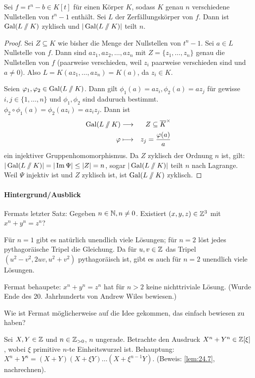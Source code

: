 \documentclass[12pt,a4paper]{scrartcl}
\begin{document}
\begin{lem}\label{lem:24.7}
	Sei $f = t^n-b\in K[t]$ für einen Körper $K$, sodass $K$ genau $n$ verschiedene Nullstellen von $t^n-1$ enthält. Sei $L$ der Zerfällungskörper von $f$. Dann ist $\operatorname{Gal}(L\sslash K)$ zyklisch und $|\operatorname{Gal}(L\sslash K)|$ teilt $n$.
\end{lem}
\begin{proof}
	Sei $Z\subseteq K$ wie bisher die Menge der Nullstellen von $t^n-1$. Sei $a\in L$ Nullstelle von $f$. Dann sind $az_1, az_2,\dots, az_n$ mit $Z  = \{z_1,\dots, z_n\}$ genau die Nullstellen von $f$ (paarweise verschieden, weil $z_i$ paarweise verschieden sind und $a\neq 0$). Also $L = K(az_1,\dots, az_n)  = K(a)$, da $z_i\in K$.
	
	Seien $\varphi_1,\varphi_2\in \operatorname{Gal}(L\sslash K)$. Dann gilt $\phi_1(a) = az_i, \phi_2(a) = az_j$ für gewisse $i,j\in\{1,\dots, n\}$ und $\phi_1,\phi_2$ sind daduruch bestimmt. $\phi_2\circ\phi_1(a) = \phi_2(az_i) = az_iz_j$. Dann ist
	\begin{eqnarray*}
		\operatorname{Gal}(L\sslash K) & \longrightarrow & Z\subseteq \overline{K}^{\times}\\
		\varphi & \longmapsto & z_j = \frac{\varphi(a)}{a}
	\end{eqnarray*}
	ein injektiver Gruppenhomomorphismus. Da $Z$ zyklisch der Ordnung $n$ ist, gilt: $|\operatorname{Gal}(L\sslash K)| = |\operatorname{Im}\Psi|\leq |Z| = n$, sogar $|\operatorname{Gal}(L\sslash K)|$ teilt $n$ nach Lagrange. Weil $\Psi$ injektiv ist und $Z$ zyklisch ist, ist $\operatorname{Gal}(L\sslash K)$ zyklisch.
\end{proof}




\paragraph{Hintergrund/Ausblick}
Fermats letzter Satz: Gegeben $n\in\mathbb N, n\neq 0$. Existiert $(x,y,z)\in\mathbb Z^3$ mit $x^n+y^n = z^n$?

Für $n=1$ gibt es natürlich unendlich viele Lösungen; für $n=2$ löst jedes pythagoräische Tripel die Gleichung. Da für $u,v\in\mathbb Z$ das Tripel $(u^2-v^2, 2uv, u^2+v^2)$ pythagoräisch ist, gibt es auch für $n = 2$ unendlich viele Lösungen.

Fermat behaupete: $x^n+y^n = z^n$ hat für $n>2$ keine nichttriviale Lösung. (Wurde Ende des 20. Jahrhunderts von Andrew Wiles bewiesen.)

\noindent Wie ist Fermat möglicherweise auf die Idee gekommen, das einfach bewiesen zu haben?

Sei $X,Y\in \mathbb Z$ und $n\in\mathbb Z_{>0}$, $n $ ungerade. Betrachte den Ausdruck $X^n+Y^n\in\mathbb Z[\xi]$, wobei $\xi$ primitive $n$-te Einheitswurzel ist. Behauptung: $X^n+Y^n = (X+Y)(X+\xi Y)\dots(X+\xi^{n-1}Y)$. (Beweis: \ref{lem:24.7}, nachrechnen).
\end{document}
